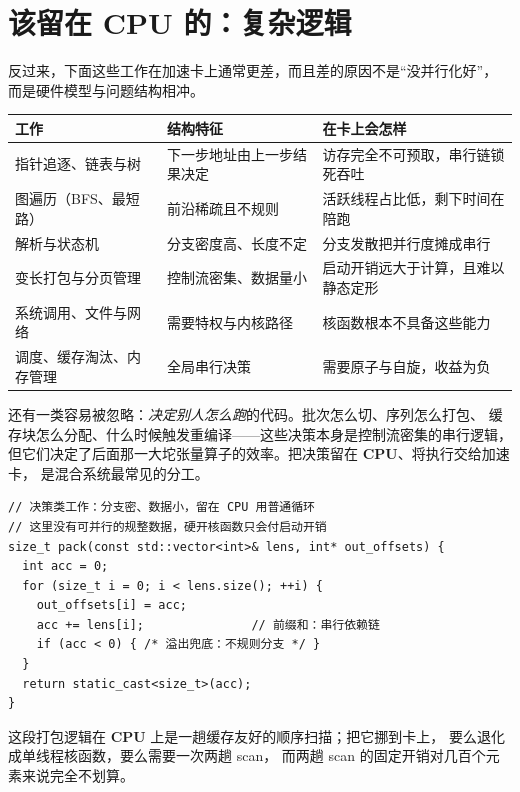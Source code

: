 \documentclass[12pt,a4paper,fontset=fandol]{ctexbook}
\newcommand{\Dom}[1]{\textsf{\bfseries #1}}
\newcommand{\CPU}{\Dom{CPU}}
\begin{document}
\section{该留在 \CPU{} 的：复杂逻辑}

反过来，下面这些工作在加速卡上通常更差，而且差的原因不是``没并行化好''，
而是硬件模型与问题结构相冲。

\begin{compare}[title={六类\, \CPU{} \,专属的活}]
\begin{tabular}{@{}>{\raggedright\arraybackslash}p{}
  >{\raggedright\arraybackslash}p{}
  >{\raggedright\arraybackslash}p{}@{}}
\toprule
工作 & 结构特征 & 在卡上会怎样 \\
\midrule
指针追逐、链表与树 & 下一步地址由上一步结果决定 &
  访存完全不可预取，串行链锁死吞吐 \\
图遍历（BFS、最短路） & 前沿稀疏且不规则 &
  活跃线程占比低，剩下时间在陪跑 \\
解析与状态机 & 分支密度高、长度不定 &
  分支发散把并行度摊成串行 \\
变长打包与分页管理 & 控制流密集、数据量小 &
  启动开销远大于计算，且难以静态定形 \\
系统调用、文件与网络 & 需要特权与内核路径 &
  核函数根本不具备这些能力 \\
调度、缓存淘汰、内存管理 & 全局串行决策 &
  需要原子与自旋，收益为负 \\
\bottomrule
\end{tabular}
\end{compare}

还有一类容易被忽略：\emph{决定别人怎么跑}的代码。批次怎么切、序列怎么打包、
缓存块怎么分配、什么时候触发重编译——这些决策本身是控制流密集的串行逻辑，
但它们决定了后面那一大坨张量算子的效率。把决策留在 \CPU{}、将执行交给加速卡，
是混合系统最常见的分工。

\begin{lstlisting}[style=cppstyle,caption={同一件事的两种放置：小数据上卡是负收益}]
// 决策类工作：分支密、数据小，留在 CPU 用普通循环
// 这里没有可并行的规整数据，硬开核函数只会付启动开销
size_t pack(const std::vector<int>& lens, int* out_offsets) {
  int acc = 0;
  for (size_t i = 0; i < lens.size(); ++i) {
    out_offsets[i] = acc;
    acc += lens[i];               // 前缀和：串行依赖链
    if (acc < 0) { /* 溢出兜底：不规则分支 */ }
  }
  return static_cast<size_t>(acc);
}
\end{lstlisting}

这段打包逻辑在 \CPU{} 上是一趟缓存友好的顺序扫描；把它挪到卡上，
要么退化成单线程核函数，要么需要一次两趟 scan，
而两趟 scan 的固定开销对几百个元素来说完全不划算。
\end{document}
